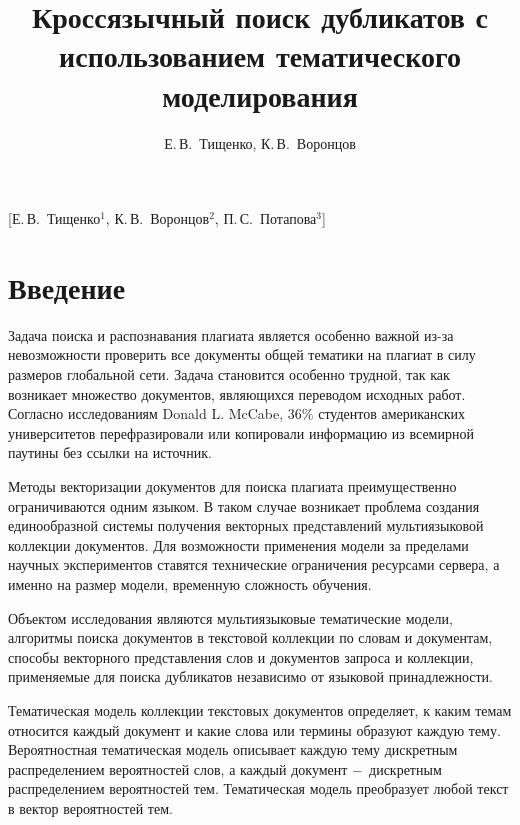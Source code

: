 \documentclass[12pt, twoside]{article}
\begin{document}
\title
    []
    {Кроссязычный поиск дубликатов с использованием тематического моделирования}

\author
    [Е.\,В.~Тищенко]
    {Е.\,В.~Тищенко, К.\,В.~Воронцов}
    [Е.\,В.~Тищенко$^1$, К.\,В.~Воронцов$^2$, П.\,С.~Потапова$^3$]




\maketitle
\linenumbers
\section{Введение}

Задача поиска и распознавания плагиата является особенно важной из-за невозможности проверить все документы общей тематики на плагиат в силу размеров глобальной сети. Задача становится особенно трудной, так как возникает множество документов, являющихся переводом исходных работ. Согласно исследованиям Donald L. McCabe,\cite{donaldSurvey}  $ 36\% $ студентов американских университетов перефразировали или копировали информацию из всемирной паутины без ссылки на источник. 

Методы векторизации документов для поиска плагиата  \cite{methodMLPlag, regression} преимущественно ограничиваются одним языком. В таком случае возникает проблема создания единообразной системы получения векторных представлений мультиязыковой коллекции документов. Для возможности применения модели за пределами научных экспериментов ставятся технические ограничения ресурсами сервера, а именно на размер модели, временную сложность обучения.

Объектом исследования являются мультиязыковые тематические модели, алгоритмы поиска документов в текстовой коллекции по словам и документам, способы векторного представления слов и документов запроса и коллекции, применяемые для поиска дубликатов независимо от языковой принадлежности.

Тематическая модель коллекции текстовых документов определяет, к каким темам относится каждый документ и какие слова или термины образуют каждую тему. Вероятностная тематическая модель описывает каждую тему дискретным распределением вероятностей слов, а каждый документ $\--$ дискретным распределением вероятностей тем. Тематическая модель преобразует любой текст в вектор вероятностей тем. 
\end{document}
